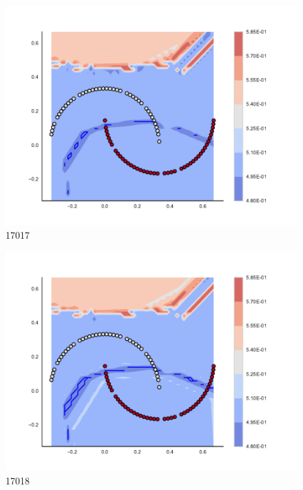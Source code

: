 \begin{subfigure}[b]{0.09\textwidth}
    \includegraphics[clip, trim=2.35cm 1.75cm 4.5cm 0cm,width=\textwidth]{img/convergence/17017.pdf}
    \caption{17017}
    \label{fig:convergence_17017}
\end{subfigure}
%
\begin{subfigure}[b]{0.09\textwidth}
    \includegraphics[clip, trim=2.35cm 1.75cm 4.5cm 0cm,width=\textwidth]{img/convergence/17018.pdf}
    \caption{17018}
    \label{fig:convergence_17018}
\end{subfigure}
%
